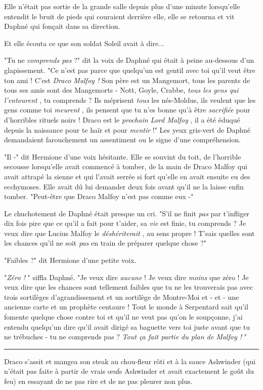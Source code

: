 Elle n'était pas sortie de la grande salle depuis plus d'une minute lorsqu'elle entendit le bruit de pieds qui couraient derrière elle, elle se retourna et vit Daphné qui fonçait dans sa direction.

Et elle écouta ce que son soldat Soleil avait à dire...

"Tu ne \emph{comprends pas}  ?" dit la voix de Daphné qui était à peine au-dessous d'un glapissement. "Ce n'est pas parce que quelqu'un est gentil avec toi qu'il veut être ton ami ! C'est \emph{Draco Malfoy !}  Son père est un Mangemort, tous les parents de tous ses amis sont des Mangemorts - Nott, Goyle, Crabbe, \emph{tous les gens qui l'entourent} , tu comprends ? Ils méprisent \emph{tous}  les nés-Moldus, ils veulent que les gens comme toi \emph{meurent} , ils pensent que tu n'es bonne qu'à être \emph{sacrifiée}  pour d'horribles rituels noirs ! Draco est le \emph{prochain Lord Malfoy} , il a été éduqué depuis la naissance pour te haïr et pour \emph{mentir}  !" Les yeux gris-vert de Daphné demandaient farouchement un assentiment ou le signe d'une compréhension.

"Il -" dit Hermione d'une voix hésitante. Elle se souvint du toit, de l'horrible secousse lorsqu'elle avait commencé à tomber, de la main de Draco Malfoy qui avait attrapé la sienne et qui l'avait serrée si fort qu'elle en avait ensuite eu des ecchymoses. Elle avait dû lui demander deux fois avant qu'il ne la laisse enfin tomber. "Peut-être que Draco Malfoy n'est pas comme eux -"

Le chuchotement de Daphné était presque un cri. "S'il ne finit \emph{pas}  par t'infliger dix fois pire que ce qu'il a fait pour t'aider, sa \emph{vie}  est finie, tu comprends ? Je veux dire que Lucius Malfoy le \emph{déshériterait} , au sens propre ! T'sais quelles sont les chances qu'il ne soit \emph{pas}  en train de préparer quelque chose ?"

"Faibles ?" dit Hermione d'une petite voix.

"\emph{Zéro !} " siffla Daphné. "Je veux dire \emph{aucune}  ! Je veux dire \emph{moins}  que zéro ! Je veux dire que les chances sont tellement faibles que tu ne les trouverais pas avec trois sortilèges d'agrandissement et un sortilège de Montre-Moi et - et - une ancienne carte et un prophète centaure ! Tout le monde à Serpentard sait qu'il fomente quelque chose contre toi et qu'il ne veut pas qu'on le soupçonne, j'ai entendu quelqu'un dire qu'il avait dirigé sa baguette vers toi juste avant que tu ne trébuches - tu ne comprends pas ? \emph{Tout ça fait partie du plan de Malfoy !} "
\par\noindent\rule{\textwidth}{0.4pt}
Draco s'assit et mangea son steak au chou-fleur rôti et à la sauce Ashwinder (qui n'était pas faite à partir de vrais œufs Ashwinder et avait exactement le goût du feu) en essayant de ne pas rire et de ne pas pleurer non plus.

